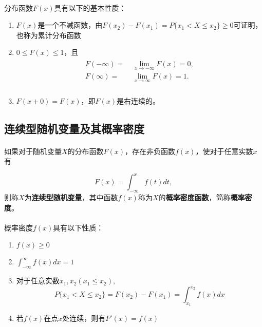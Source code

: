 \paragraph{}
分布函数$F(x)$具有以下的基本性质：

\begin{enumerate}
  \item $F(x)$是一个不减函数，由$F(x_2) - F(x_1) = P\{x_1 < X \leq x_2\} \geq 0$可证明，也称为累计分布函数
  \item $0 \leq F(x) \leq 1$，且
  \begin{align}
    \begin{split}
      F(-\infty) =&\; \lim_{x \to -\infty}F(x) = 0, \\
      F(\infty) =&\; \lim_{x \to \infty}F(x) = 1. \\
    \end{split}
  \end{align}
  \item $F(x+0) = F(x)$，即$F(x)$是右连续的。
\end{enumerate}

\subsection{连续型随机变量及其概率密度}
\paragraph{}
如果对于随机变量$X$的分布函数$F(x)$，存在非负函数$f(x)$，使对于任意实数$x$有

\begin{equation}
  \label{连续型随机变量的分布函数}
  F(x) = \int_{-\infty}^{x}f(t)dt,
\end{equation}
则称$X$为\textbf{连续型随机变量}，其中函数$f(x)$称为$X$的\textbf{概率密度函数}，简称\textbf{概率密度}。

\paragraph{}
概率密度$f(x)$具有以下性质：
\begin{enumerate}
  \item $f(x) \geq 0$
  \item $\int_{-\infty}^{\infty}f(x)dx=1$
  \item 对于任意实数$x_1, x_2(x_1 \leq x_2),$
  \begin{equation}
    P\{x_1 < X \leq x_2\} = F(x_2) - F(x_1) = \int_{x_1}^{x_2}f(x)dx
  \end{equation}
  \item 若$f(x)$在点$x$处连续，则有$F'(x) = f(x)$
\end{enumerate}

